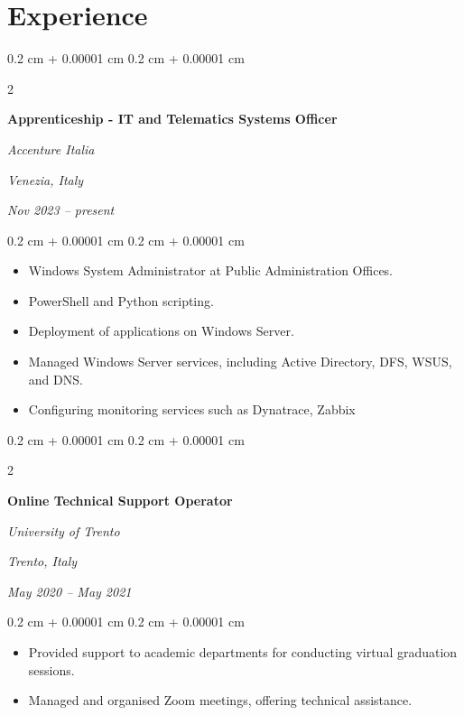 \documentclass[10pt, a4paper]{article}
\newenvironment{highlights}{
    \begin{itemize}[
        topsep=0.10 cm,
        parsep=0.10 cm,
        partopsep=0pt,
        itemsep=0pt,
        leftmargin=0.4 cm + 10pt
    ]
}{
    \end{itemize}
} %
\newenvironment{onecolentry}{
    \begin{adjustwidth}{
        0.2 cm + 0.00001 cm
    }{
        0.2 cm + 0.00001 cm
    }
}{
    \end{adjustwidth}
} %
\newenvironment{twocolentry}[2][]{
    \onecolentry
    \def\secondColumn{#2}
    \setcolumnwidth{\fill, 6.5 cm}
    \begin{paracol}{2}
}{
    \switchcolumn \raggedleft \secondColumn
    \end{paracol}
    \endonecolentry
} %
\begin{document}
    
    \section{Experience}



        
        \begin{twocolentry}{
        \textit{Venezia, Italy}    
            
        \textit{Nov 2023 – present}}
            \textbf{Apprenticeship - IT and Telematics Systems Officer}
            
            \textit{Accenture Italia}
        \end{twocolentry}

        \vspace{0.10 cm}
        \begin{onecolentry}
            \begin{highlights}
                \item Windows System Administrator at Public Administration Offices.
                \item PowerShell and Python scripting.
                \item Deployment of applications on Windows Server.
                \item Managed Windows Server services, including Active Directory, DFS, WSUS, and DNS.
                \item Configuring monitoring services such as Dynatrace, Zabbix
            \end{highlights}
        \end{onecolentry}


        \vspace{0.4 cm}

        \begin{twocolentry}{
        \textit{Trento, Italy}    
            
        \textit{May 2020 – May 2021}}
            \textbf{Online Technical Support Operator}
            
            \textit{University of Trento}
        \end{twocolentry}

        \vspace{0.10 cm}
        \begin{onecolentry}
            \begin{highlights}
                \item Provided support to academic departments for conducting virtual graduation sessions.
                \item Managed and organised Zoom meetings, offering technical assistance.
            \end{highlights}
        \end{onecolentry}
\end{document}
